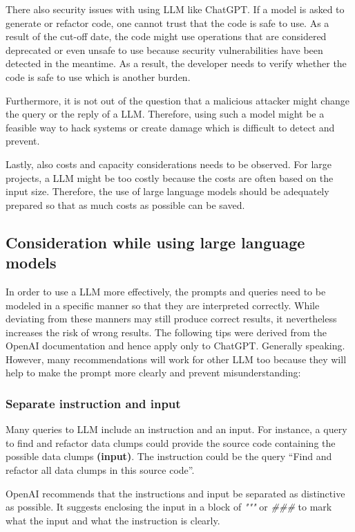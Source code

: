 There also security issues with using  \ac{LLM} like ChatGPT. If a model is asked to generate or refactor code, one cannot trust that the code is safe to use. As a result of the cut-off date, the code might use operations that are considered deprecated or even unsafe to use because security vulnerabilities have been detected in the meantime. As a result, the developer needs to verify whether the code is safe to use which is another burden. 

Furthermore, it is not out of the question that a malicious attacker might change the query or the reply of a \ac{LLM}. Therefore, using such a model might be a feasible way to hack systems or create damage which is difficult to detect and prevent.

Lastly, also costs and capacity considerations needs to be observed. For large projects, a \ac{LLM} might be too costly because  the costs are often based on the input size. Therefore, the use of large language models should be adequately prepared so that as much costs as possible can be saved.  
\subsection{Consideration while using large language models}
In order to use a \ac{LLM} more effectively, the prompts and queries need to be modeled in a specific manner so that they are interpreted correctly. While deviating from these manners may still produce correct results, it nevertheless increases the risk of wrong results. The following tips were derived from the OpenAI documentation \cite{ChatGPT_url} and hence apply only to ChatGPT. Generally speaking. However, many recommendations will work for other \ac{LLM} too because they will help to make the prompt more clearly and prevent misunderstanding:

\subsubsection{Separate instruction and input}
Many queries to \ac{LLM} include an instruction and an input. For instance, a query to find and refactor data clumps could  provide the source code containing the possible data clumps \textbf{(input)}. The instruction could be the query \enquote{Find and refactor all data clumps in this source code}. 

OpenAI recommends that the instructions and input be separated as distinctive as possible. It suggests enclosing the input in a block of \textit{"""} or \textit{\#\#\#} to mark what the input and what the instruction is clearly.

